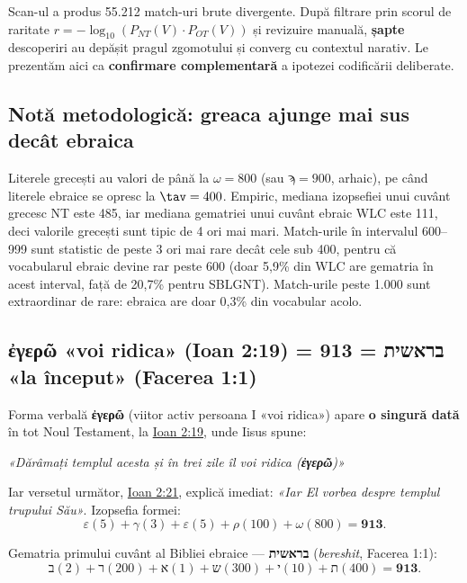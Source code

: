 \documentclass[12pt,a4paper,twoside,openany]{book}
\begin{document}
Scan-ul a produs 55.212 match-uri brute divergente. După filtrare prin scorul de raritate $r = -\log_{10}(P_{NT}(V) \cdot P_{OT}(V))$ și revizuire manuală, \textbf{șapte} descoperiri au depășit pragul zgomotului și converg cu contextul narativ. Le prezentăm aici ca \textbf{confirmare complementară} a ipotezei codificării deliberate.

\subsection*{Notă metodologică: greaca ajunge mai sus decât ebraica}

Literele grecești au valori de până la $\omega = 800$ (sau $\textrm{ϡ} = 900$, arhaic), pe când literele ebraice se opresc la $\tav = 400$. Empiric, mediana izopsefiei unui cuvânt grecesc NT este 485, iar mediana gematriei unui cuvânt ebraic WLC este 111, deci valorile grecești sunt tipic de 4 ori mai mari. Match-urile în intervalul 600--999 sunt statistic de peste 3 ori mai rare decât cele sub 400, pentru că vocabularul ebraic devine rar peste 600 (doar 5,9\% din WLC are gematria în acest interval, față de 20,7\% pentru SBLGNT). Match-urile peste 1.000 sunt extraordinar de rare: ebraica are doar 0,3\% din vocabular acolo.

\subsection{\texorpdfstring{ἐγερῶ}{egero} «voi ridica» (Ioan 2:19) = 913 = בראשית «la început» (Facerea 1:1)}
\label{sec:egero}

Forma verbală \textbf{ἐγερῶ} (viitor activ persoana I «voi ridica») apare \textbf{o singură dată} în tot Noul Testament, la \href{https://bibliaortodoxa.ro/carte.php?id=35\&cap=2\#19}{Ioan 2:19}, unde Iisus spune:

\begin{biblequote}
\textit{«Dărâmați templul acesta și în trei zile îl voi ridica (\textbf{ἐγερῶ})»}
\end{biblequote}

Iar versetul următor, \href{https://bibliaortodoxa.ro/carte.php?id=35\&cap=2\#21}{Ioan 2:21}, explică imediat: \textit{«Iar El vorbea despre templul trupului Său»}. Izopsefia formei:
\[
\varepsilon(5) + \gamma(3) + \varepsilon(5) + \rho(100) + \omega(800) = \mathbf{913}.
\]

Gematria primului cuvânt al Bibliei ebraice — \textbf{בראשית} (\textit{bereshit}, Facerea 1:1):
\[
\textrm{ב}(2) + \textrm{ר}(200) + \textrm{א}(1) + \textrm{ש}(300) + \textrm{י}(10) + \textrm{ת}(400) = \mathbf{913}.
\]
\end{document}
